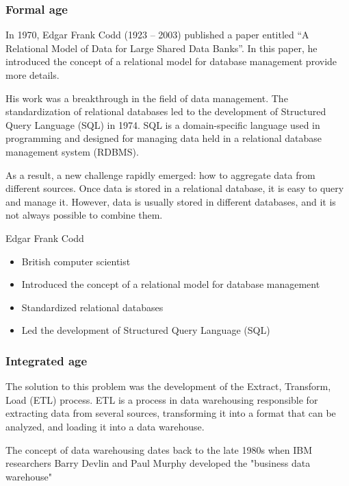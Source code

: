 \subsubsection{Formal age}

In 1970, Edgar Frank Codd (1923 -- 2003) published a paper entitled ``A Relational Model
of Data for Large Shared Data Banks''.  In this paper, he introduced
the concept of a relational model for database management {\color{red}
provide more details}.

His work was a breakthrough in the field of data management.  The standardization of
relational databases led to the development of Structured Query Language (SQL) in 1974.
SQL is a domain-specific language used in programming and designed for managing data held
in a relational database management system (RDBMS).

As a result, a new challenge rapidly emerged: how to aggregate data from different
sources. Once data is stored in a relational database, it is easy to query and manage
it. However, data is usually stored in different databases, and it is not always possible
to combine them.

\begin{slidebox}{Edgar Frank Codd}{}
  \begin{itemize}
    \item British computer scientist
    \item Introduced the concept of a relational model for database management
    \item Standardized relational databases
    \item Led the development of Structured Query Language (SQL)
  \end{itemize}
\end{slidebox}

\subsubsection{Integrated age}

The solution to this problem was the development of the Extract, Transform, Load (ETL)
process.  ETL is a process in data warehousing responsible for extracting data from
several sources, transforming it into a format that can be analyzed, and loading it into a
data warehouse.

The concept of data warehousing dates back to the late 1980s when IBM researchers Barry
Devlin and Paul Murphy developed the "business data warehouse"

